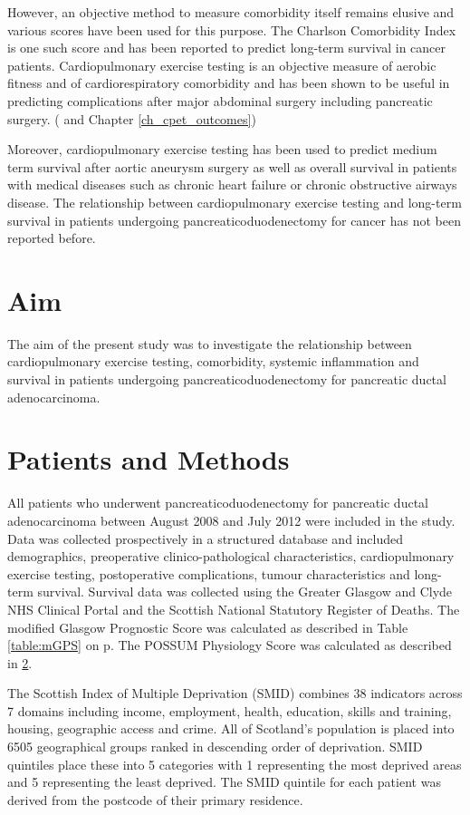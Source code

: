However, an objective method to measure comorbidity itself remains elusive and various scores have been used for this purpose. The Charlson Comorbidity Index is one such score and has been reported to predict long-term survival in cancer patients. Cardiopulmonary exercise testing is an objective measure of aerobic fitness and of cardiorespiratory comorbidity and has been shown to be useful in predicting complications after major abdominal surgery including pancreatic surgery. (\parencite{ausania_effects_2012} and Chapter \ref{ch_cpet_outcomes})

Moreover, cardiopulmonary exercise testing has been used to predict medium term survival after aortic aneurysm surgery \parencite{carlisle_mid-term_2007} as well as overall survival in patients with medical diseases such as chronic heart failure or chronic obstructive airways disease. The relationship between cardiopulmonary exercise testing and long-term survival in patients undergoing pancreaticoduodenectomy for cancer has not been reported before. 

\section{Aim}
The aim of the present study was to investigate the relationship between cardiopulmonary exercise testing, comorbidity, systemic inflammation and survival in patients undergoing pancreaticoduodenectomy for pancreatic ductal adenocarcinoma.

\section{Patients and Methods}
All patients who underwent pancreaticoduodenectomy for pancreatic ductal adenocarcinoma between August 2008 and July 2012 were included in the study. Data was collected prospectively in a structured database and included demographics, preoperative clinico-pathological characteristics, cardiopulmonary exercise testing, postoperative complications, tumour characteristics and long-term survival. Survival data was collected using the Greater Glasgow and Clyde NHS Clinical Portal and the Scottish National Statutory Register of Deaths. The modified Glasgow Prognostic Score was calculated as described in Table \ref{table:mGPS} on p\pageref{table:mGPS}. The POSSUM Physiology Score was calculated as described in \ref{}. 

The Scottish Index of Multiple Deprivation (SMID) combines 38 indicators across 7 domains including  income, employment, health, education, skills and training, housing, geographic access and crime.  All of Scotland's population is placed into 6505 geographical groups ranked in descending order of deprivation. SMID quintiles place these into 5 categories with 1 representing the most deprived areas and 5 representing the least deprived. The SMID quintile for each patient was derived from the postcode of their primary residence.

